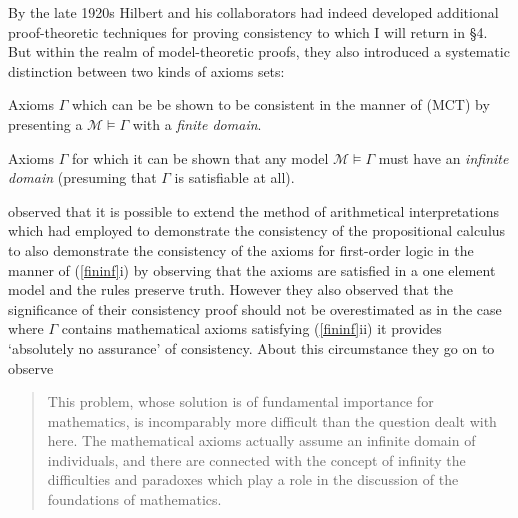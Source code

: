 \documentclass[11pt,fleqn,leqno]{article}
\begin{document}
By the late 1920s Hilbert and his collaborators had indeed developed additional proof-theoretic techniques for proving consistency to which I will return in \S4.  But within the realm of model-theoretic proofs, they also introduced a systematic distinction between two kinds of axioms sets: 
\begin{example}
\label{fininf}
\begin{compactenum}[i)]
\item Axioms $\Gamma$ which can be  be shown to be consistent in the manner of (MCT) by presenting a $\mathcal{M} \models \Gamma$ with a \textsl{finite domain}.
\item  Axioms $\Gamma$ for which it can be shown that any model $\mathcal{M} \models \Gamma$ must have an \textsl{infinite domain} (presuming that $\Gamma$ is satisfiable at all).
\end{compactenum}
\end{example}
\citet{Hilbert1928} observed that it is possible to extend the method of arithmetical interpretations which \citet{Bernays1918a} had employed to demonstrate the consistency of the propositional calculus to also demonstrate the consistency of the axioms for first-order logic in the manner of (\ref{fininf}i) by observing that the axioms are satisfied in a one element model and the rules preserve truth.   However they also observed that the significance of their consistency proof should not be overestimated as in the case where $\Gamma$ contains mathematical axioms satisfying (\ref{fininf}ii) it provides  `absolutely no assurance' of consistency.  About this circumstance they go on to observe
\begin{quote}
{\footnotesize This problem, whose solution is of fundamental importance for mathematics, is incomparably more difficult than the question dealt with here. The mathematical axioms actually assume an infinite domain of individuals, and there are connected with the concept of infinity the difficulties and paradoxes which play a role in the discussion of the foundations of mathematics.  \hfill \citeyearpar[p. 65-66]{Hilbert1928}}
\end{quote}
\end{document}
